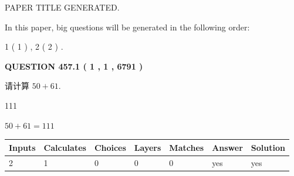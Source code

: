 \documentclass{ctexart}
\begin{document}
   
 \vspace{0.2in}
 
 
 
 
   
   
 PAPER TITLE GENERATED.
   
   
   
\vspace{0.2in}
   
In this paper, big questions will be generated in the following order: 
   
   
   1 ( 1 )
 ,
   2 ( 2 )
 .
  
\vspace{0.2in}
  
{\textbf{\Large{QUESTION
457.1 
 ( 1 , 1 , 6791 )
}}}
  
  
 
请计算 $ %
50 +  %
61 $.
 
 
 
\noindent{}
 
 

111
 
 
\noindent{}
 
 

 
 
 
\noindent{}
 
 

$ %
50 +  %
61=   %
111$
 
 
\noindent{}
 
 

 
   
   
   
   
\noindent\begin{tabular}{|l|l|l|l|l|l|l|}
 \hline
Inputs & Calculates & Choices & Layers & Matches & Answer & Solution \\ \hline
 2  & 
 1  & 
 0
  & 
 0  & 
 0  & 
  yes & 
  yes 
  \\ \hline
 \end{tabular}
   
   
   
   
\noindent{}
   
   
  
\end{document}
